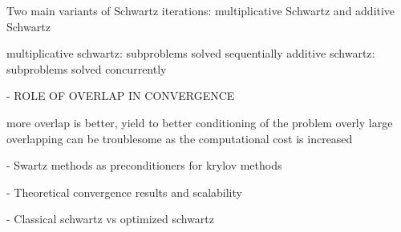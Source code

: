 \begin{description}
Two main variants of Schwartz iterations: multiplicative Schwartz and additive Schwartz

multiplicative schwartz: subproblems solved sequentially 
additive schwartz: subproblems solved concurrently 

- ROLE OF OVERLAP IN CONVERGENCE

more overlap is better, yield to better conditioning of the problem
overly large overlapping can be troublesome as the computational cost is increased

- Swartz methods as preconditioners for krylov methods


- Theoretical convergence results and scalability



- Classical schwartz vs optimized schwartz





\item[Substructuring methods]


\end{description}




